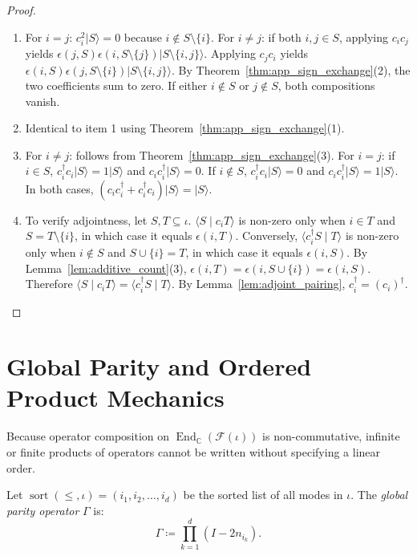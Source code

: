 \begin{proof}
\begin{enumerate}
    \item For $i = j$: $c_i^2 |S\rangle = 0$ because $i \notin S \setminus \{i\}$.
    For $i \neq j$: if both $i, j \in S$, applying $c_i c_j$ yields $\epsilon(j, S) \epsilon(i, S \setminus \{j\}) |S \setminus \{i, j\}\rangle$.
    Applying $c_j c_i$ yields $\epsilon(i, S) \epsilon(j, S \setminus \{i\}) |S \setminus \{i, j\}\rangle$.
    By Theorem~\ref{thm:app_sign_exchange}(2), the two coefficients sum to zero. If either $i \notin S$ or $j \notin S$, both compositions vanish.
    \item Identical to item 1 using Theorem~\ref{thm:app_sign_exchange}(1).
    \item For $i \neq j$: follows from Theorem~\ref{thm:app_sign_exchange}(3).
    For $i = j$: if $i \in S$, $c_i^\dagger c_i |S\rangle = 1 |S\rangle$ and $c_i c_i^\dagger |S\rangle = 0$.
    If $i \notin S$, $c_i^\dagger c_i |S\rangle = 0$ and $c_i c_i^\dagger |S\rangle = 1 |S\rangle$.
    In both cases, $(c_i c_i^\dagger + c_i^\dagger c_i)|S\rangle = |S\rangle$.
    \item To verify adjointness, let $S, T \subseteq \iota$.
    $\langle S \mid c_i T \rangle$ is non-zero only when $i \in T$ and $S = T \setminus \{i\}$, in which case it equals $\epsilon(i, T)$.
    Conversely, $\langle c_i^\dagger S \mid T \rangle$ is non-zero only when $i \notin S$ and $S \cup \{i\} = T$, in which case it equals $\epsilon(i, S)$.
    By Lemma~\ref{lem:additive_count}(3), $\epsilon(i, T) = \epsilon(i, S \cup \{i\}) = \epsilon(i, S)$.
    Therefore $\langle S \mid c_i T \rangle = \langle c_i^\dagger S \mid T \rangle$.
    By Lemma~\ref{lem:adjoint_pairing}, $c_i^\dagger = (c_i)^\dagger$.
\end{enumerate}
\end{proof}

\section{Global Parity and Ordered Product Mechanics}

Because operator composition on $\operatorname{End}_{\mathbb{C}}(\mathcal{F}(\iota))$ is non-commutative, infinite or finite products of operators cannot be written without specifying a linear order.

\begin{definition}
Let $\operatorname{sort}(\le, \iota) = (i_1, i_2, \dots, i_d)$ be the sorted list of all modes in $\iota$. The \emph{global parity operator} $\Gamma$ is:
\begin{equation}
\Gamma \coloneqq \prod_{k=1}^d (I - 2 n_{i_k}).
\end{equation}
\end{definition}

